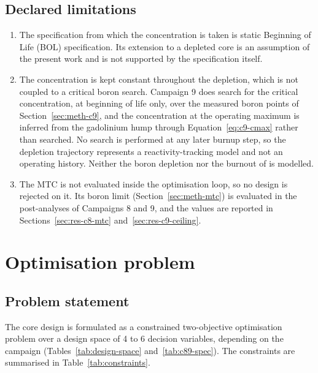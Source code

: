 \subsection{Declared limitations}
\label{sec:meth-boron-limits}

\begin{enumerate}
  \item The specification from which the concentration is taken is static
        Beginning of Life (BOL) specification. Its extension to a
        depleted core is an assumption of the present work and is not
        supported by the specification itself.
  \item The concentration is kept constant throughout the depletion,
        which is not coupled to a critical boron search. Campaign 9 does search
        for the critical concentration, at beginning of life only, over
        the measured boron points of Section~\ref{sec:meth-c9}, and the
        concentration at the operating maximum is inferred from the
        gadolinium hump through Equation~\eqref{eq:c9-cmax} rather than
        searched. No search is performed at any later burnup step, so
        the depletion trajectory represents a reactivity-tracking model
        and not an operating history. Neither the boron depletion nor
        the burnout of  is modelled.
  \item The MTC is not evaluated inside the optimisation loop, so no
        design is rejected on it. Its boron limit
        (Section~\ref{sec:meth-mtc}) is evaluated in the post-analyses of
        Campaigns 8 and 9, and the values are reported in
        Sections~\ref{sec:res-c8-mtc} and~\ref{sec:res-c9-ceiling}.
\end{enumerate}

\section{Optimisation problem}
\label{sec:meth-problem}

\subsection{Problem statement}

The core design is formulated as a constrained two-objective
optimisation problem over a design space of 4 to 6 decision variables, depending on the campaign (Tables~\ref{tab:design-space}
and~\ref{tab:c89-spec}). The constraints are summarised in
Table~\ref{tab:constraints}.

